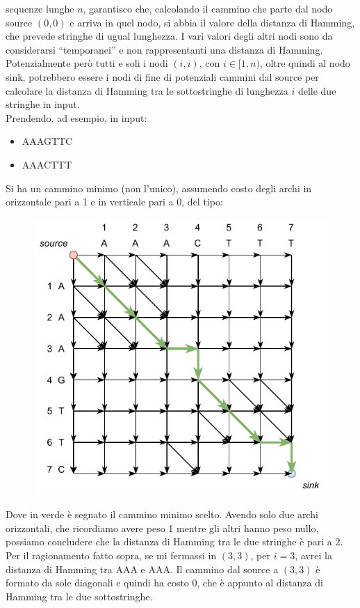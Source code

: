\documentclass[a4paper,12pt, oneside]{book}
\begin{document}
sequenze lunghe $n$, garantisco che, calcolando il cammino che parte dal nodo
source $(0,0)$ e arriva in quel nodo, si abbia il valore della
distanza di Hamming, che prevede stringhe di ugual lunghezza. I vari valori
degli altri nodi sono da considerarsi ``temporanei'' e non rappresentanti una
distanza di Hamming. Potenzialmente però tutti e soli i nodi $(i,i)$, con
$i\in[1,n)$, oltre quindi al nodo sink, potrebbero essere i nodi di fine di
potenziali cammini dal source per calcolare la distanza di Hamming tra le
sottostringhe di lunghezza $i$ delle due stringhe in input.\\
Prendendo, ad esempio, in input:
\begin{itemize}
  \item AAAGTTC
  \item AAACTTT
\end{itemize}
Si ha un cammino minimo (non l'unico), assumendo costo degli archi in
orizzontale pari a 1 e in verticale pari a 0, del tipo:
\begin{figure}[H]
  \centering
  \includegraphics[scale = 1]{img/es3.pdf}
\end{figure}
\noindent
Dove in verde è segnato il cammino minimo scelto. Avendo solo due archi
orizzontali, che ricordiamo avere peso 1 mentre gli altri hanno peso nullo,
possiamo concludere che la distanza di Hamming tra le due stringhe è 
pari a 2.\\
Per il ragionamento fatto sopra, se mi fermassi in $(3,3)$, per $i=3$, avrei la
distanza di Hamming tra AAA e AAA. Il cammino dal source a $(3,3)$ è formato da
sole diagonali e quindi ha costo 0, che è appunto al distanza di Hamming tra le
due sottostringhe.
\end{document}
